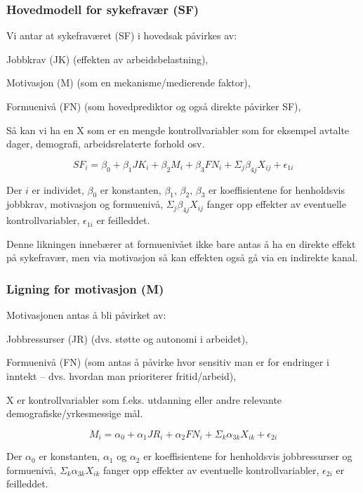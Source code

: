 \documentclass[
  12pt,
  a4paper,
  DIV=11,
  numbers=noendperiod]{scrartcl}
\begin{document}
\subsubsection{Hovedmodell for sykefravær
(SF)}\label{hovedmodell-for-sykefravuxe6r-sf}

Vi antar at sykefraværet (SF) i hovedsak påvirkes av:

Jobbkrav (JK) (effekten av arbeidsbelastning),

Motivasjon (M) (som en mekanisme/medierende faktor),

Formuenivå (FN) (som hovedprediktor og også direkte påvirker SF),

Så kan vi ha en X som er en mengde kontrollvariabler som for eksempel
avtalte dager, demografi, arbeidsrelaterte forhold osv.

\[
SF_i = \beta_0 + \beta_1 JK_i + \beta_2 M_i + \beta_3 FN_i + \Sigma_j \beta_{4j}X_{ij} + \epsilon_{1i}
\]

Der \(i\) er individet, \(\beta_0\) er konstanten, \(\beta_1\),
\(\beta_2\), \(\beta_3\) er koeffisientene for henholdsvis jobbkrav,
motivasjon og formuenivå, \(\Sigma_j \beta_{4j}X_{ij}\) fanger opp
effekter av eventuelle kontrollvariabler, \(\epsilon_{1i}\) er
feilleddet.

Denne likningen innebærer at formuenivået ikke bare antas å ha en
direkte effekt på sykefravær, men via motivasjon så kan effekten også gå
via en indirekte kanal.

\subsubsection{Ligning for motivasjon
(M)}\label{ligning-for-motivasjon-m}

Motivasjonen antas å bli påvirket av:

Jobbressurser (JR) (dvs. støtte og autonomi i arbeidet),

Formuenivå (FN) (som antas å påvirke hvor sensitiv man er for endringer
i inntekt -- dvs. hvordan man prioriterer fritid/arbeid),

X er kontrollvariabler som f.eks. utdanning eller andre relevante
demografiske/yrkesmessige mål.

\[
M_i = \alpha_0 + \alpha_1 JR_i + \alpha_2 FN_i + \Sigma_k \alpha_{3k}X_{ik} + \epsilon_{2i}
\]

Der \(\alpha_0\) er konstanten, \(\alpha_1\) og \(\alpha_2\) er
koeffisientene for henholdsvis jobbressurser og formuenivå,
\(\Sigma_k \alpha_{3k}X_{ik}\) fanger opp effekter av eventuelle
kontrollvariabler, \(\epsilon_{2i}\) er feilleddet.
\end{document}
